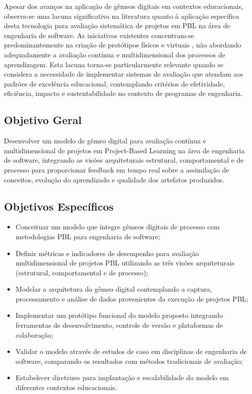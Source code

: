 \documentclass[12pt,a4paper]{article}
\renewcommand{\cite}[1]{}
\begin{document}
Apesar dos avanços na aplicação de gêmeos digitais em contextos educacionais,
observa-se uma lacuna significativa na literatura quanto à aplicação específica
desta tecnologia para avaliação sistemática de projetos em PBL na área de
engenharia de software. As iniciativas existentes concentram-se
predominantemente na criação de protótipos físicos e virtuais
\cite{bachmann2023}, não abordando adequadamente a avaliação contínua e
multidimensional dos processos de aprendizagem. Esta lacuna torna-se
particularmente relevante quando se considera a necessidade de implementar
sistemas de avaliação que atendam aos padrões de excelência educacional,
contemplando critérios de efetividade, eficiência, impacto e sustentabilidade
no contexto de programas de engenharia.

\subsection{Objetivo Geral}

Desenvolver um modelo de gêmeo digital para avaliação
contínua e multidimensional de projetos em Project-Based Learning na área de
engenharia de software, integrando as visões arquiteturais estrutural,
comportamental e de processo para proporcionar feedback em tempo real sobre a
assimilação de conceitos, evolução do aprendizado e qualidade dos artefatos
produzidos.

\subsection{Objetivos Específicos}

\begin{itemize}
  \item Conceituar um modelo que integre gêmeos digitais de processo com metodologias
        PBL para engenharia de software;
  \item Definir métricas e indicadores de desempenho para avaliação multidimensional de
        projetos PBL utilizando as três visões arquiteturais (estrutural,
        comportamental e de processo);
  \item Modelar a arquitetura do gêmeo digital contemplando a captura, processamento e
        análise de dados provenientes da execução de projetos PBL;
  \item Implementar um protótipo funcional do modelo proposto integrando ferramentas de
        desenvolvimento, controle de versão e plataformas de colaboração;
  \item Validar o modelo através de estudos de caso em disciplinas de engenharia de
        software, comparando os resultados com métodos tradicionais de avaliação;
  \item Estabelecer diretrizes para implantação e escalabilidade do modelo em
        diferentes contextos educacionais.
\end{itemize}
\end{document}

